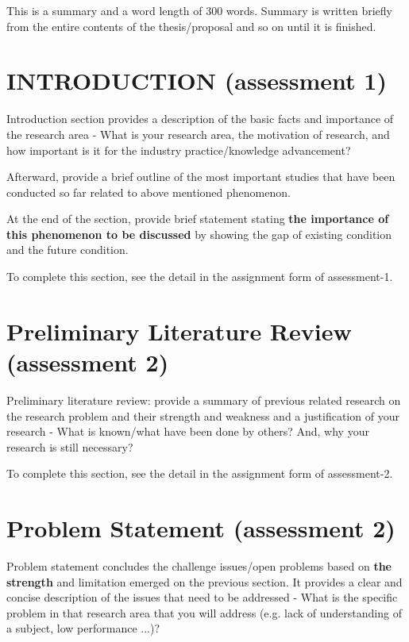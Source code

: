 \documentclass{ittelkom}
\begin{document}

{This is a summary and a word length of 300 words. Summary is written briefly from the entire contents of the thesis/proposal and so on until it is finished.}

\newpage
\section{INTRODUCTION \color{red}(assessment 1)}
Introduction section provides a description of the basic facts and importance of the research area - What is your research area, the motivation of research, and how important is it for the industry practice/knowledge advancement?



Afterward, provide a brief outline of the most important studies that have been conducted so far related to above mentioned phenomenon.

At the end of the section, provide brief statement stating {\bf the importance of this phenomenon to be discussed} by showing the gap of existing condition and the future condition.

To complete this section, see the detail in the assignment form of assessment-1.

\section{Preliminary Literature Review \color{red}(assessment 2)}
Preliminary literature review: provide a summary of previous related research on the research problem and their strength and weakness and a justification of your research - What is known/what have been done by others? And, why your research is still necessary?

To complete this section, see the detail in the assignment form of assessment-2.

\section{Problem Statement \color{red} (assessment 2)} \label{resquest}
Problem statement concludes the challenge issues/open problems based on {\bf the strength} and limitation emerged on the previous section. It provides a clear and concise description of the issues that need to be addressed - What is the specific problem in that research area that you will address (e.g. lack of understanding of a subject, low performance ...)?
\end{document}
